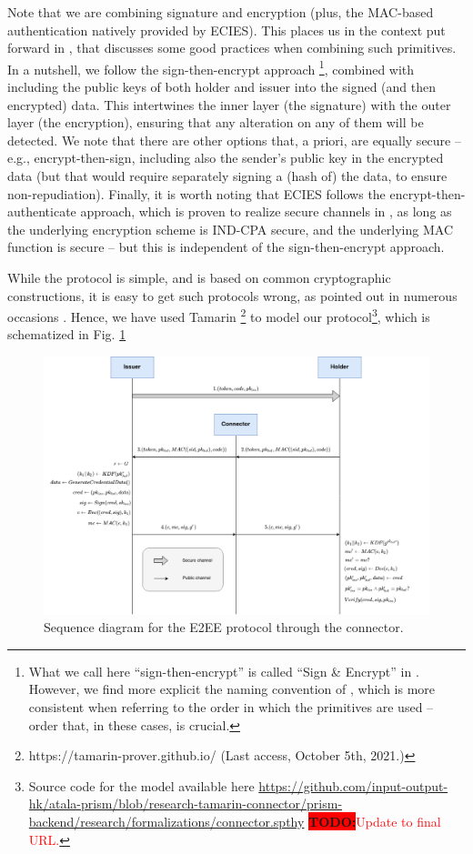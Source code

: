 \documentclass[10pt,a4paper]{article}
\newcommand{\figref}[1]{Fig. \ref{#1}}
\newcommand{\todo}[1]{{\colorbox{red}{\bf TODO:}\textcolor{red}{#1}}}
\begin{document}
Note that we are combining signature and encryption (plus, the MAC-based
authentication natively provided by ECIES). This places us in the context put
forward in \cite{davi01}, that discusses some good practices when combining such
primitives. In a nutshell, we follow the sign-then-encrypt approach%
\footnote{What we call here ``sign-then-encrypt'' is called ``Sign \& Encrypt''
  in \cite{davi01}. However, we find
  more explicit the naming convention of \cite{kraw01}, which is more consistent
  when referring to the order in which the primitives are used -- order that, in
  these cases, is crucial.}, combined with including the public
keys of both holder and issuer into the signed (and then encrypted) data.
This intertwines the inner layer (the signature) with the outer layer (the
encryption), ensuring that any alteration on any of them will be detected.
We note that there are other options that, a priori, are equally secure -- e.g.,
encrypt-then-sign, including also the sender's public key in the encrypted data
(but that would require separately signing a (hash of) the data, to ensure
non-repudiation). Finally, it is worth noting that ECIES follows the
encrypt-then-authenticate approach, which is proven to realize secure channels
in \cite{kraw01}, as long as the underlying encryption scheme is IND-CPA secure,
and the underlying MAC function is secure -- but this is independent of the
sign-then-encrypt approach.

While the protocol is simple, and is based on common cryptographic constructions,
it is easy to get such protocols wrong, as pointed out in numerous occasions
\cite{davi01, kraw01}. Hence, we have used Tamarin%
\footnote{https://tamarin-prover.github.io/ (Last access, October 5th, 2021.)}
to model our protocol\footnote{Source code for the model available here
  \url{https://github.com/input-output-hk/atala-prism/blob/research-tamarin-connector/prism-backend/research/formalizations/connector.spthy}
  \todo{Update to final URL.}}, which is schematized in \figref{fig:e2econnector}

\begin{figure}[ht!]
  \centering
  \includegraphics[scale=0.4]{figures/connector.png}
  \caption{Sequence diagram for the E2EE protocol through the connector.}
  \label{fig:e2econnector}%
\end{figure}
\end{document}
